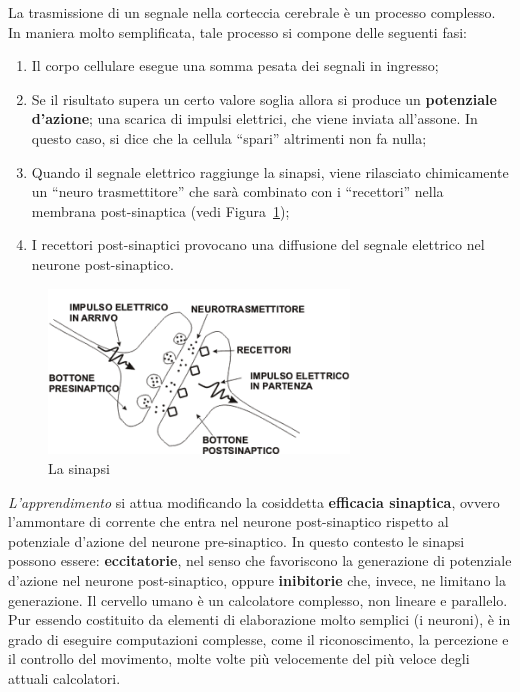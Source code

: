 \newpage
La trasmissione di un segnale nella corteccia cerebrale è un processo complesso.
In maniera molto semplificata, tale processo si compone delle seguenti fasi:
\begin{enumerate}
	\item Il corpo cellulare esegue una somma pesata dei segnali in ingresso;
	\item Se il risultato supera un certo valore soglia allora si produce un \textbf{potenziale d'azione}; una scarica di impulsi elettrici, che viene inviata all'assone. In questo caso, si dice che la cellula ``spari'' altrimenti non fa nulla;
	\item Quando il segnale elettrico raggiunge la sinapsi, viene rilasciato chimicamente un “neuro trasmettitore” che sarà combinato con i “recettori” nella membrana post-sinaptica (vedi Figura~\ref{fig:synapse});
	\item I recettori post-sinaptici provocano una diffusione del segnale elettrico nel neurone post-sinaptico.
\end{enumerate}

\begin{figure}[h!]
	\centering
	\includegraphics[width=8cm]{images/synapse.png}
	\caption{La sinapsi}\label{fig:synapse}
\end{figure}
\emph{L'apprendimento} si attua modificando la cosiddetta \textbf{efficacia sinaptica}, ovvero l'ammontare di corrente che entra nel neurone post-sinaptico rispetto al potenziale d'azione del neurone pre-sinaptico. In questo contesto le sinapsi possono essere: \textbf{eccitatorie}, nel senso che favoriscono la generazione di potenziale d'azione nel neurone post-sinaptico, oppure \textbf{inibitorie} che, invece, ne limitano la generazione.
Il cervello umano è un calcolatore complesso, non lineare e parallelo. Pur essendo costituito da elementi di elaborazione molto semplici (i neuroni), è in grado di eseguire computazioni complesse, come il riconoscimento, la percezione e il controllo del movimento, molte volte più velocemente del più veloce degli attuali calcolatori.\\

